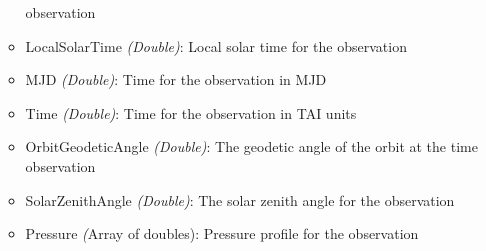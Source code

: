 \begin{itemize}
\begin{itemize}
                observation
            \item LocalSolarTime \emph{(Double)}: Local solar time for the
                observation
            \item MJD \emph{(Double)}: Time for the observation in MJD
            \item Time \emph{(Double)}: Time for the observation in TAI units
            \item OrbitGeodeticAngle \emph{(Double)}: The geodetic angle of the
                orbit at the time observation
            \item SolarZenithAngle \emph{(Double)}: The solar zenith angle for
                the observation
            \item Pressure \emph({Array of doubles}): Pressure profile for the
                observation
        \end{itemize}
\end{itemize}

